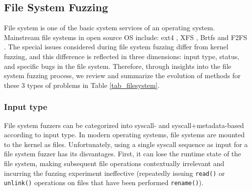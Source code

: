 \subsection{File System Fuzzing}

File system is one of the basic system services of an operating system. Mainstream file systems in open source OS include: ext4 \cite{Cao2007Ext4TN}, XFS \cite{XFS2018}, Brtfs \cite{Rodeh2013BTRFSTL} and F2FS \cite{Lee2015F2FSAN}. The special issues considered during file system fuzzing differ from kernel fuzzing, and this difference is reflected in three dimensions: input type, status, and specific bugs in the file system. Therefore, through insights into the file system fuzzing process, we review and summarize the evolution of methods for these 3 types of problems in Table \ref{tab_filesystem}.

\subsubsection{Input type}
File system fuzzers can be categorized into syscall- and syscall+metadata-based according to input type. In modern operating systems, file systems are mounted to the kernel as files.  Unfortunately, using a single syscall sequence as input for a file system fuzzer has its disvantages. First, it can lose the runtime state of the file system, making subsequent file operations contextually irrelevant and incurring the fuzzing experiment ineffective (\eg repeatedly issuing \texttt{read()} or \texttt{unlink()} operations on files that have been performed \texttt{rename()}). 


